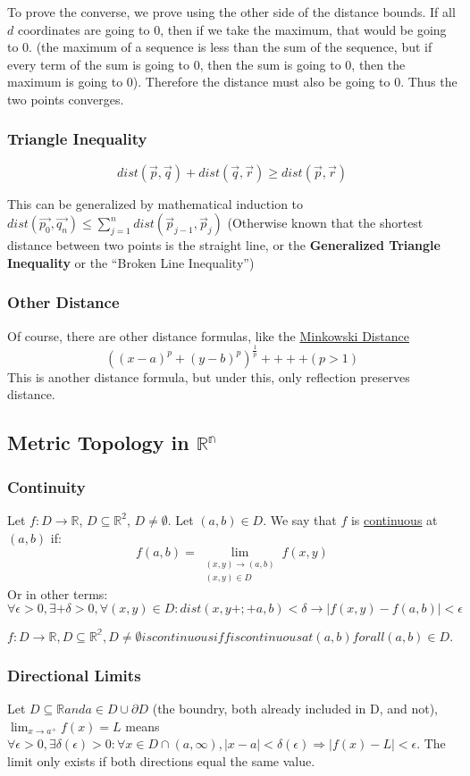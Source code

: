 \documentclass[11 pt, twoside]{article}
\begin{document}
To prove the converse, we prove using the other side of the distance bounds. If
all $d$ coordinates are going to 0, then if we take the maximum, that would be
going to 0. (the maximum of a sequence is less than the sum of the sequence, but
if every term of the sum is going to 0, then the sum is going to 0, then the
maximum is going to 0). Therefore the distance must also be going to 0. Thus the two points converges.

\subsubsection{Triangle Inequality}
$$dist(\vec{p}, \vec{q}) + dist(\vec{q}, \vec{r}) \geq dist(\vec{p}, \vec{r})$$

This can be generalized by mathematical induction to $dist(\vec{p_0}, \vec{q_n})
\leq \sum_{j = 1}^n dist(\vec{p}_{j - 1}, \vec{p}_{j})$ (Otherwise known that the
shortest distance between two points is the straight line, or the \textbf{Generalized
Triangle Inequality} or the ``Broken Line Inequality'')

\subsubsection{Other Distance}
Of course, there are other distance formulas, like the \underline{Minkowski Distance}
$$((x - a)^p + (y - b)^p)^{\frac{1}{p}} ++++ (p > 1)$$
This is another distance formula, but under this, only reflection preserves
distance.

\subsection{Metric Topology in $\mathbb{R^n}$}
\subsubsection{Continuity}
Let $f: D\to\mathbb{R}$, $D\subseteq\mathbb{R}^2$, $D\neq\emptyset$. Let $(a, b)\in D$. We say that $f$ is \underline{continuous} at $(a, b)$ if:
$$f(a, b) = \lim_{\substack{(x, y)\to(a,b)\\(x, y)\in D}} f(x, y)$$
Or in other terms:
$$\forall \epsilon > 0, \exists+ \delta>0, \forall (x, y)\in D: dist(x,
y+;+a,b) < \delta \to |f(x,y) - f(a,b)| < \epsilon$$

$f:D \to \mathbb{R}, D \subseteq \mathbb{R^2}, D \neq \emptyset is continuous if f is continuous at (a, b) for all (a, b) \in D.$

\subsubsection{Directional Limits}
Let $D \subseteq \mathbb{R} and a \in D \cup \partial D$ (the boundry, both already included in D, and not), $\lim_{x \to a^+} f(x) = L$ means $\forall \epsilon > 0, \exists \delta(\epsilon) > 0: \forall x \in D \cap (a, \infty), |x-a| < \delta(\epsilon) \Rightarrow |f(x) - L| < \epsilon$. The limit only exists if both directions equal the same value.
\end{document}
